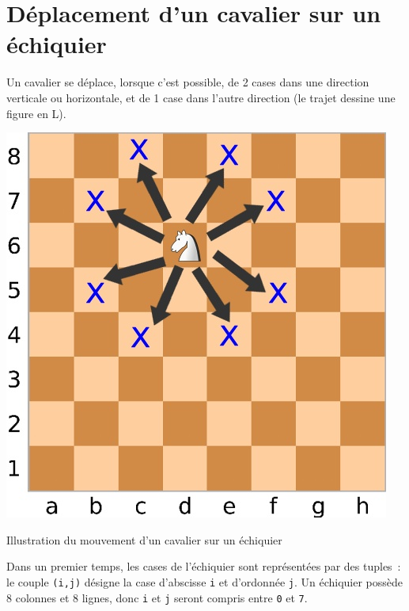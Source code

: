 \vspace{-0.5cm}
\section*{Déplacement d'un cavalier sur un échiquier}


Un cavalier se déplace, lorsque c'est possible, de 2 cases dans une direction verticale ou horizontale, et de 1 case dans l'autre direction (le trajet dessine une figure en L).

\begin{marginfigure}
		\includegraphics[width=\linewidth]{deplacement-cavalier}
	\caption{Illustration du mouvement d'un cavalier sur un échiquier}
\end{marginfigure}

Dans un premier temps, les cases de l'échiquier sont représentées par des tuples~: le couple \texttt{(i,j)} désigne la case d'abscisse \texttt{i} et d'ordonnée \texttt{j}. Un échiquier possède 8 colonnes et 8 lignes, donc \texttt{i} et \texttt{j} seront compris entre \texttt{0} et \texttt{7}.


